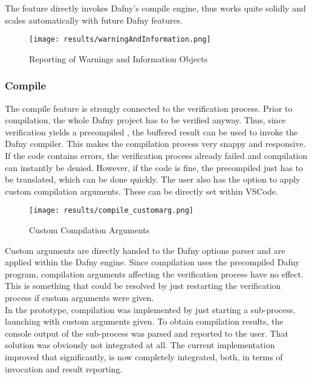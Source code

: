 The feature directly invokes Dafny's compile engine, thus works quite solidly and scales automatically with future Dafny features.

\begin{figure}[H]
    \centering
    \texttt{[image: results/warningAndInformation.png]}
    \caption{Reporting of Warnings and Information Objects}
    \label{fig:result_warnd_info}
\end{figure}

\subsubsection{Compile}
The compile feature is strongly connected to the verification process.
Prior to compilation, the whole Dafny project has to be verified anyway.
Thus, since verification yields a precompiled , the buffered result can be used to invoke the Dafny compiler.
This makes the compilation process very snappy and responsive.\\

If the code contains errors, the verification process already failed and compilation can instantly be denied.
However, if the code is fine, the precompiled  just has to be translated, which can be done quickly.
The user also has the option to apply custom compilation arguments.
These can be directly set within VSCode.

\begin{figure}[H]
    \centering
    \texttt{[image: results/compile\_customarg.png]}
    \caption{Custom Compilation Arguments}
    \label{fig:compilation_custom_args}
\end{figure}

Custom arguments are directly handed to the Dafny options parser and are applied within the Dafny engine.
Since compilation uses the precompiled Dafny program, compilation arguments affecting the verification process have no effect.
This is something that could be resolved by just restarting the verification process if custom arguments were given.\\

In the prototype, compilation was implemented by just starting a sub-process, launching  with custom arguments given.
To obtain compilation results, the console output of the sub-process was parsed and reported to the user.
That solution was obviously not integrated at all.
The current implementation improved that significantly, is now completely integrated, both, in terms of invocation and result reporting.

